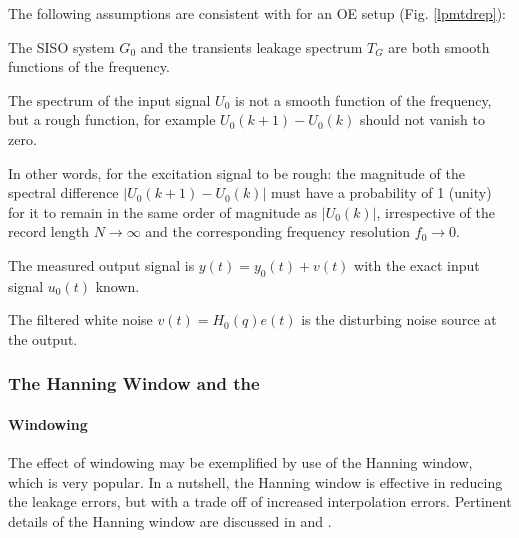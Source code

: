 The following assumptions are consistent with \citep{Schoukens2009LPM} for an OE setup (Fig. \ref{lpmtdrep}):
\begin{assumption}
The SISO system $G_0$ and  the transients leakage spectrum $T_G$ are both smooth functions of the frequency.
\end{assumption}



\begin{assumption}

The spectrum of the  input signal $U_0$ is not a smooth function of the frequency, but a rough function, for example $U_0(k+1) - U_0(k)$ should not vanish to zero. %
\end{assumption}

In other words, for the excitation signal to be rough: the magnitude of the spectral difference $|U_0(k+1) - U_0(k)|$ must have a probability of 1 (unity) for it to remain in the same order of magnitude as $|U_0(k)|$, irrespective of the record length $N\rightarrow\infty$ and the corresponding  frequency resolution $f_0\rightarrow{0}$.


\begin{assumption}
The measured output signal is $y(t) = y_0(t) + v(t)$ with the exact input signal $u_0(t)$ known. 
\end{assumption}


\begin{assumption}
The filtered white noise $v(t) = H_0(q)e(t)$ is the disturbing noise source at the output.
\end{assumption}


\subsubsection{The Hanning Window and the }\label{se:LPMFRFest}%
\paragraph{Windowing}
The effect of windowing may be  exemplified by use of the Hanning window, which is very popular.  In a nutshell, the Hanning window is effective in reducing  the leakage errors, but  with a trade off of increased interpolation errors. %
Pertinent details of the Hanning window are discussed in \citep{Schoukens2006LPM,Antoni2007FRF,Schoukens2009LPM,Wellstead1981} and \citep{Harris1978}.

